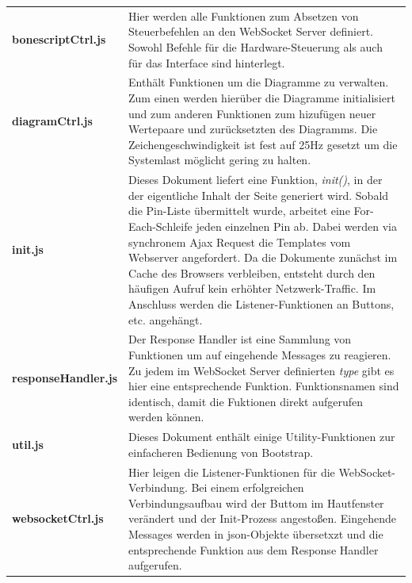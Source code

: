 \begin{longtabu} to \textwidth {
  X[1]
  X[3]}
  \textbf{bonescriptCtrl.js} & Hier werden alle Funktionen zum Absetzen von Steuerbefehlen an den WebSocket Server definiert. Sowohl Befehle für die Hardware-Steuerung als auch für das Interface sind hinterlegt.\newline\\
  
  \textbf{diagramCtrl.js} & Enthält Funktionen um die Diagramme zu verwalten. Zum einen werden hierüber die Diagramme initialisiert und zum anderen Funktionen zum hizufügen neuer Wertepaare und zurücksetzten des Diagramms. Die Zeichengeschwindigkeit ist fest auf 25Hz gesetzt um die Systemlast möglicht gering zu halten.\newline\\

  \textbf{init.js} & Dieses Dokument liefert eine Funktion, \textit{init()}, in der der eigentliche Inhalt der Seite generiert wird. Sobald die Pin-Liste übermittelt wurde, arbeitet eine For-Each-Schleife jeden einzelnen Pin ab. Dabei werden via synchronem Ajax Request die Templates vom Webserver angefordert. Da die Dokumente zunächst im Cache des Browsers verbleiben, entsteht durch den häufigen Aufruf kein erhöhter Netzwerk-Traffic. Im Anschluss werden die Listener-Funktionen an Buttons, etc. angehängt.\newline\\

  \textbf{responseHandler.js} & Der Response Handler ist eine Sammlung von Funktionen um auf eingehende Messages zu reagieren. Zu jedem im WebSocket Server definierten \textit{type} gibt es hier eine entsprechende Funktion. Funktionsnamen sind identisch, damit die Fuktionen direkt aufgerufen werden können.\newline\\

  \textbf{util.js} & Dieses Dokument enthält einige Utility-Funktionen zur einfacheren Bedienung von Bootstrap.\newline\\

  \textbf{websocketCtrl.js} & Hier leigen die Listener-Funktionen für die WebSocket-Verbindung. Bei einem erfolgreichen Verbindungsaufbau wird der Buttom im Hautfenster verändert und der Init-Prozess angestoßen. Eingehende Messages werden in \gls{json}-Objekte übersetxzt und die entsprechende Funktion aus dem Response Handler aufgerufen.\newline\\
\end{longtabu}


